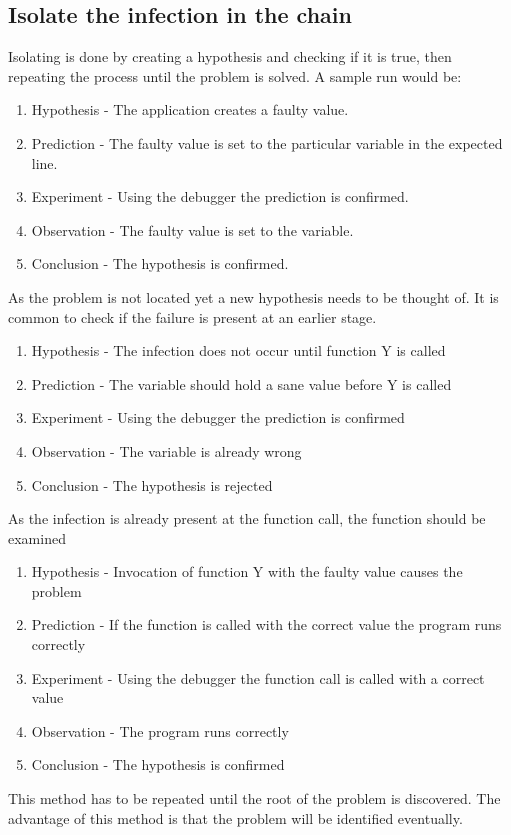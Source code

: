 \subsection{Isolate the infection in the chain}
\label{aodZellerIsolateDefect}
Isolating is done by creating a hypothesis and checking if it is true, then repeating the process until the problem is solved. A sample run would be:
\begin{enumerate}
  \item Hypothesis - The application creates a faulty value.
  \item Prediction - The faulty value is set to the particular variable in the expected line.
  \item Experiment - Using the debugger the prediction is confirmed.
  \item Observation - The faulty value is set to the variable.
  \item Conclusion - The hypothesis is confirmed.
\end{enumerate}
As the problem is not located yet a new hypothesis needs to be thought of. It is common to check if the failure is present at an earlier stage.
\begin{enumerate}
  \item Hypothesis - The infection does not occur until function Y is called
  \item Prediction - The variable should hold a sane value before Y is called
  \item Experiment - Using the debugger the prediction is confirmed
  \item Observation - The variable is already wrong
  \item Conclusion - The hypothesis is rejected
\end{enumerate}
As the infection is already present at the function call, the function should be examined
\begin{enumerate}
  \item Hypothesis - Invocation of function Y with the faulty value causes the problem
  \item Prediction - If the function is called with the correct value the program runs correctly
  \item Experiment - Using the debugger the function call is called with a correct value
  \item Observation - The program runs correctly
  \item Conclusion - The hypothesis is confirmed
\end{enumerate}
This method has to be repeated until the root of the problem is discovered. The advantage of this method is that the problem will be identified eventually.

